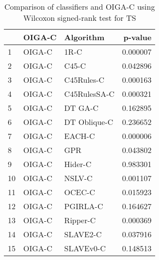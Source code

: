 \begin{table}
\footnotesize
\caption{Comparison of classifiers and OIGA-C using Wilcoxon signed-rank test for TS}
\label{tab:OIGA-C wilcoxon TS comparison}
\begin{tabular}{lllr}
\hline
 & OIGA-C & Algorithm & p-value \\
\hline
1 & OIGA-C & 1R-C & 0.000007 \\
2 & OIGA-C & C45-C & 0.042896 \\
3 & OIGA-C & C45Rules-C & 0.000163 \\
4 & OIGA-C & C45RulesSA-C & 0.000321 \\
5 & OIGA-C & DT GA-C & 0.162895 \\
6 & OIGA-C & DT Oblique-C & 0.236652 \\
7 & OIGA-C & EACH-C & 0.000006 \\
8 & OIGA-C & GPR & 0.043802 \\
9 & OIGA-C & Hider-C & 0.983301 \\
10 & OIGA-C & NSLV-C & 0.001107 \\
11 & OIGA-C & OCEC-C & 0.015923 \\
12 & OIGA-C & PGIRLA-C & 0.164627 \\
13 & OIGA-C & Ripper-C & 0.000369 \\
14 & OIGA-C & SLAVE2-C & 0.037916 \\
15 & OIGA-C & SLAVEv0-C & 0.148513 \\
\hline
\end{tabular}
\end{table}
